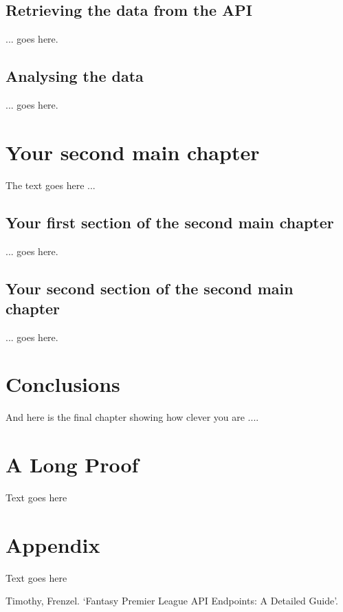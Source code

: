 \documentclass[12pt, a4paper,oneside]{book}
\numberwithin{equation}{section}
\begin{document}
\section{Retrieving the data from the API}\label{sec:2.1}

... goes here.

\section{Analysing the data}\label{sec:2.2}

... goes here.

\chapter{Your second main chapter}\label{ch:3}

The text goes here ... 

\section{Your first section of the second main chapter}\label{sec:3.1}

... goes here.

\section{Your second section of the second main chapter}\label{sec:3.2}

... goes here.

\chapter{Conclusions}\label{ch:concl}
And here is the final chapter showing how clever you are ....

\appendix
\chapter{A Long Proof}

Text goes here

\chapter{Appendix}

Text goes here

\begin{thebibliography}{999}

Timothy, Frenzel.
\newblock `Fantasy Premier League API Endpoints: A Detailed Guide'.

\end{thebibliography}
\end{document}
